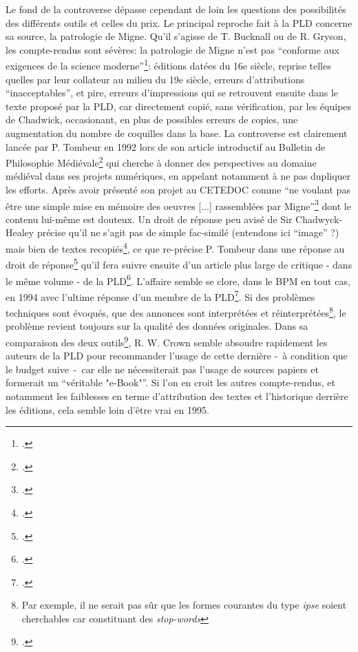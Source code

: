 Le fond de la controverse dépasse cependant de loin les questions des possibilités des différents outils et celles du prix. Le principal reproche fait à la PLD concerne sa source, la patrologie de Migne. Qu'il s'agisse de T. Bucknall ou de R. Gryson, les compte-rendus sont sévères: la patrologie de Migne n'est pas \enquote{conforme aux exigences de la science moderne}\footcite[p.~147]{gryson_patrologia_1997}: éditions datées du 16e siècle, reprise telles quelles par leur collateur au milieu du 19e siècle, erreurs d'attributions \enquote{inacceptables}, et pire, erreurs d'impressions qui se retrouvent ensuite dans le texte proposé par la PLD, car directement copié, sans vérification, par les équipes de Chadwick, occasionant, en plus de possibles erreurs de copies, une augmentation du nombre de coquilles dans la base. La controverse est clairement lancée par P. Tombeur en 1992 lors de son article introductif au Bulletin de Philosophie Médiévale\footcite{tombeur_informatique_1992} qui cherche à donner des perspectives au domaine médiéval dans ses projets numériques, en appelant notamment à ne pas dupliquer les efforts. Après avoir présenté son projet au CETEDOC comme \enquote{ne voulant pas être une simple mise en mémoire des oeuvres {[...] rassemblées par Migne}}\footcite[p. 454{tombeur_informatique_1992}, il présente en contraste la PLD comme une \enquote{photocopie électro-magnétique de l'oeuvre de l'abbé Migne}\footcite[p. 45]{tombeur_informatique_1992} dont le contenu lui-même est douteux. Un droit de réponse peu avisé de Sir Chadwyck-Healey précise qu'il ne s'agit pas de simple fac-similé (entendons ici \enquote{image} ?) mais bien de textes recopiés\footcite{chadwick-healey_droit_1993}, ce que re-précise P. Tombeur dans une réponse au droit de réponse\footcite{tombeur_reponse_1993} qu'il fera suivre ensuite d'un article plus large de critique - dans le même volume - de la PLD\footcite{tombeur_pld_1993}. L'affaire semble se clore, dans le BPM en tout cas, en 1994 avec l'ultime réponse d'un membre de la PLD\footcite{jordan_facts_1994}. Si des problèmes techniques sont évoqués, que des annonces sont interprétées et réinterprétées\footnote{Par exemple, il ne serait pas sûr que les formes courantes du type \textit{ipse} soient cherchables car constituant des \textit{stop-words}}, le problème revient toujours sur la qualité des données originales. Dans sa comparaison des deux outils\footcite{crown_comparing_2000}, R. W. Crown semble absoudre rapidement les auteurs de la PLD pour recommander l'usage de cette dernière -~à condition que le budget suive~-~car elle ne nécessiterait pas l'usage de sources papiers et formerait un \enquote{véritable "e-Book"}. Si l'on en croit les autres compte-rendus, et notamment les faiblesses en terme d'attribution des textes et l'historique derrière les éditions, cela semble loin d'être vrai en 1995.

